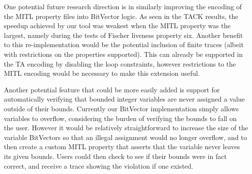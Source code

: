 \documentclass[a4paper,11pt]{report}
\theoremstyle{definition}
\begin{document}
One potential future research direction is in similarly improving the encoding
of the MITL property files into BitVector logic. As seen in the TACK results,
the speedup achieved by our tool was weakest when the MITL property was the
largest, namely during the tests of Fischer liveness property six. Another
benefit to this re-implementation would be the potential inclusion of finite
traces (albeit with restrictions on the properties supported). This can already
be supported in the TA encoding by disabling the loop constraints, however
restrictions to the MITL encoding would be necessary to make this extension useful.

Another potential feature that could be more easily added is support for
automatically verifying that bounded integer variables are never assigned a
value outside of their bounds. Currently our BitVector implementation simply
allows variables to overflow, considering the burden of verifying the bounds to
fall on the user. However it would be relatively straightforward to increase the
size of the variable BitVectors so that an illegal assignment would no longer
overflow, and to then create a custom MITL property that asserts that the
variable never leaves its given bounds. Users could then check to see if their
bounds were in fact correct, and receive a trace showing the violation if one
existed.

\newpage



\end{document}

